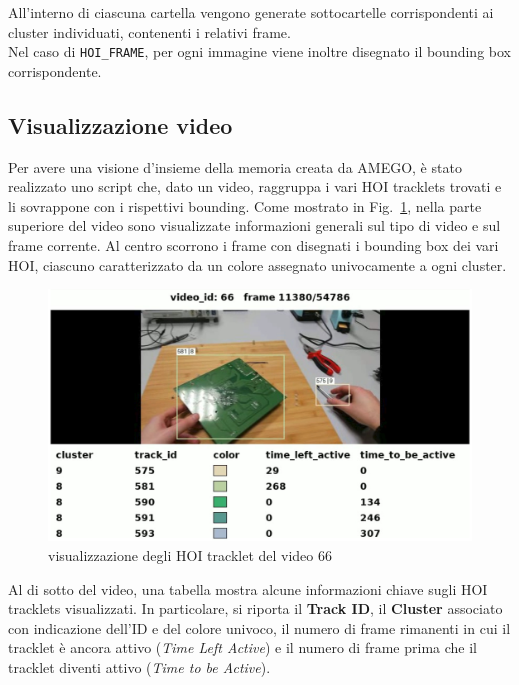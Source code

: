 All'interno di ciascuna cartella vengono generate sottocartelle corrispondenti ai cluster individuati, contenenti i relativi frame.\\
Nel caso di \texttt{HOI\_FRAME}, per ogni immagine viene inoltre disegnato il bounding box corrispondente.

\subsection*{Visualizzazione video}

Per avere una visione d'insieme della memoria creata da AMEGO, è stato realizzato uno script che, dato un video, raggruppa i vari HOI tracklets trovati e li sovrappone con i rispettivi bounding.
Come mostrato in Fig.~\ref{fig:amego_video}, nella parte superiore del video sono visualizzate informazioni generali sul tipo di video e sul frame corrente. Al centro scorrono i frame con disegnati i bounding box dei vari HOI, ciascuno caratterizzato da un colore assegnato univocamente a ogni cluster.

\begin{figure}[ht]
    \centering
    \includegraphics[width=1\linewidth]{Images/amego_video.jpg}
    \caption{visualizzazione degli HOI tracklet del video 66 }
    \label{fig:amego_video}
\end{figure}

Al di sotto del video, una tabella mostra alcune informazioni chiave sugli HOI tracklets visualizzati. In particolare, si riporta il \textbf{Track ID}, il \textbf{Cluster} associato con indicazione dell'ID e del colore univoco, il numero di frame rimanenti in cui il tracklet è ancora attivo (\textit{Time Left Active}) e il numero di frame prima che il tracklet diventi attivo (\textit{Time to be Active}).

